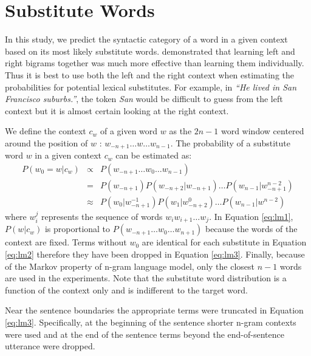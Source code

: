 \section{Substitute Words}
\label{sec:substitute_vectors}

In this study, we predict the syntactic category of a word in a given
context based on its most likely substitute words.  \cite{clair2010}
demonstrated that learning left and right bigrams together was much more
effective than learning them individually.  Thus it is best to use both the
left and the right context when estimating the probabilities for potential
lexical substitutes.  For example, in \emph{``He lived in San Francisco
suburbs.''}, the token \emph{San} would be difficult to guess from the left
context but it is almost certain looking at the right context.  

We define the context $c_w$ of a given word $w$ as the $2n-1$ word window
centered around the position of $w$ : $w_{-n+1} \ldots w \ldots w_{n-1}$.  The
probability of a substitute word $w$ in a given context $c_w$ can be estimated
as: 
\begin{eqnarray} 
  \label{eq:lm1}
  P(w_0 = w | c_w) & \propto & P(w_{-n+1}\ldots w_0\ldots w_{n-1})\\
  \label{eq:lm2}& = & P(w_{-n+1})P(w_{-n+2}|w_{-n+1})\ldots P(w_{n-1}|w_{-n+1}^{n-2})\\
  \label{eq:lm3}& \approx & P(w_0| w_{-n+1}^{-1})P(w_{1}|w_{-n+2}^0)\ldots P(w_{n-1}|w^{n-2}) 
\end{eqnarray} 
where $w_i^j$ represents the sequence of words $w_i w_{i+1} \ldots w_{j}$.  In
Equation \ref{eq:lm1}, $P(w|c_w)$ is proportional to $P(w_{-n+1}\ldots w_0
\ldots w_{n+1})$ because the words of the context are fixed.  Terms without
$w_0$ are identical for each substitute in Equation \ref{eq:lm2} therefore they
have been dropped in Equation \ref{eq:lm3}.  Finally, because of the Markov
property of n-gram language model, only the closest $n-1$ words are used in the
experiments.  Note that the substitute word distribution is a function of the
context only and is indifferent to the target word.

Near the sentence boundaries the appropriate terms were truncated in
Equation \ref{eq:lm3}.  Specifically, at the beginning of the sentence
shorter n-gram contexts were used and at the end of the sentence terms
beyond the end-of-sentence utterance were dropped.  

